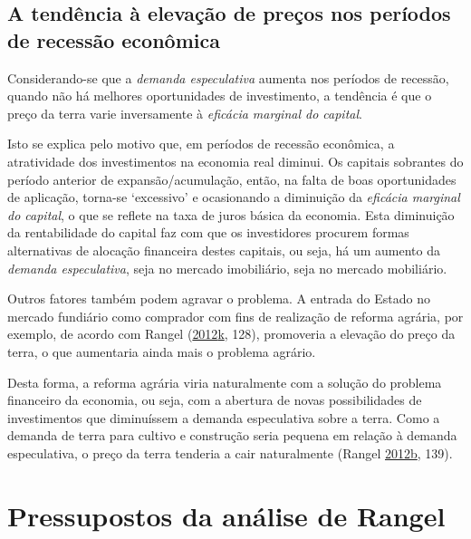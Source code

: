 \documentclass[
	12pt,				%
	oneside,			%
	a4paper,			%
	chapter=TITLE,		%
	section=TITLE,		%
	english,			%
	brazil				%
	]{abntex2}
\begin{document}
\hypertarget{a-tenduxeancia-uxe0-elevauxe7uxe3o-de-preuxe7os-nos-peruxedodos-de-recessuxe3o-econuxf4mica}{%
\subsection{A tendência à elevação de preços nos períodos de recessão econômica}\label{a-tenduxeancia-uxe0-elevauxe7uxe3o-de-preuxe7os-nos-peruxedodos-de-recessuxe3o-econuxf4mica}}

Considerando-se que a \emph{demanda especulativa} aumenta nos períodos de recessão,
quando não há melhores oportunidades de investimento, a tendência é que o preço
da terra varie inversamente à \emph{eficácia marginal do capital}.

Isto se explica pelo motivo que, em períodos de recessão econômica, a
atratividade dos investimentos na economia real diminui. Os capitais sobrantes
do período anterior de expansão/acumulação, então, na falta de boas
oportunidades de aplicação, torna-se `excessivo' e ocasionando a diminuição da
\emph{eficácia marginal do capital}, o que se reflete na taxa de juros básica da
economia. Esta diminuição da rentabilidade do capital faz com que os
investidores procurem formas alternativas de alocação financeira destes
capitais, ou seja, há um aumento da \emph{demanda especulativa}, seja no mercado
imobiliário, seja no mercado mobiliário.

Outros fatores também podem agravar o problema. A entrada do Estado no mercado
fundiário como comprador com fins de realização de reforma agrária, por exemplo,
de acordo com Rangel (\protect\hyperlink{ref-rangel1985}{2012}\protect\hyperlink{ref-rangel1985}{k}, 128), promoveria a elevação do preço da
terra, o que aumentaria ainda mais o problema agrário.

Desta forma, a reforma agrária viria naturalmente com a solução do problema
financeiro da economia, ou seja, com a abertura de novas possibilidades de
investimentos que diminuíssem a demanda especulativa sobre a terra. Como a
demanda de terra para cultivo e construção seria pequena em relação à demanda
especulativa, o preço da terra tenderia a cair naturalmente (Rangel \protect\hyperlink{ref-rangel1986b}{2012}\protect\hyperlink{ref-rangel1986b}{b}, 139).

\hypertarget{pressupostos-da-anuxe1lise-de-rangel}{%
\section{Pressupostos da análise de Rangel}\label{pressupostos-da-anuxe1lise-de-rangel}}
\end{document}
